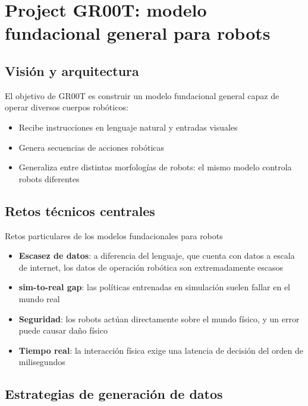 \section{Project GR00T: modelo fundacional general para robots}

\subsection{Visión y arquitectura}

El objetivo de GR00T es construir un modelo fundacional general capaz de operar diversos cuerpos robóticos:

\begin{itemize}
    \item Recibe instrucciones en lenguaje natural y entradas visuales
    \item Genera secuencias de acciones robóticas
    \item Generaliza entre distintas morfologías de robots: el mismo modelo controla robots diferentes
\end{itemize}

\subsection{Retos técnicos centrales}

\begin{warningbox}{Retos particulares de los modelos fundacionales para robots}
\begin{itemize}
    \item \textbf{Escasez de datos}: a diferencia del lenguaje, que cuenta con datos a escala de internet, los datos de operación robótica son extremadamente escasos
    \item \textbf{sim-to-real gap}: las políticas entrenadas en simulación suelen fallar en el mundo real
    \item \textbf{Seguridad}: los robots actúan directamente sobre el mundo físico, y un error puede causar daño físico
    \item \textbf{Tiempo real}: la interacción física exige una latencia de decisión del orden de milisegundos
\end{itemize}
\end{warningbox}

\subsection{Estrategias de generación de datos}

